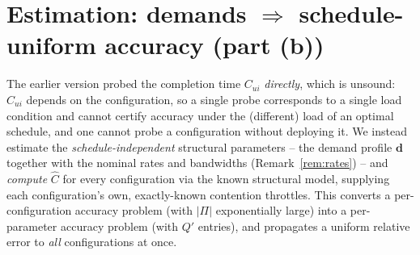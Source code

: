 \documentclass{amsart}
\theoremstyle{definition}
\newcommand{\Chat}{\widehat{C}}
\begin{document}
\section{Estimation: demands $\Rightarrow$ schedule-uniform accuracy (part (b))}\label{sec:estimate}

The earlier version probed the completion time $C_{ui}$ \emph{directly}, which is
unsound: $C_{ui}$ depends on the configuration, so a single probe corresponds to
a single load condition and cannot certify accuracy under the (different) load
of an optimal schedule, and one cannot probe a configuration without deploying
it. We instead estimate the \emph{schedule-independent} structural parameters --
the demand profile $\mathbf d$ together with the nominal rates and bandwidths
(Remark~\ref{rem:rates}) -- and \emph{compute} $\Chat$ for every configuration
via the known structural model, supplying each configuration's own,
exactly-known contention throttles. This converts a per-configuration accuracy
problem (with $|\Pi|$ exponentially large) into a per-parameter accuracy problem
(with $Q'$ entries), and propagates a uniform relative error to \emph{all}
configurations at once.
\end{document}
